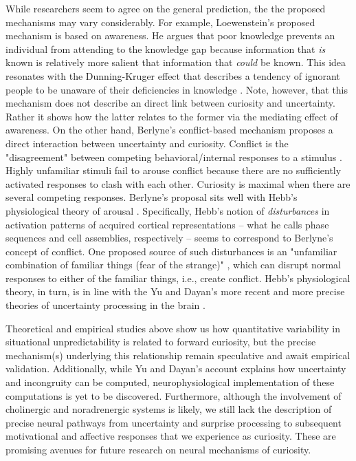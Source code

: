 While researchers seem to agree on the general prediction, the the proposed mechanisms may vary considerably. For example, Loewenstein's \cite{loewenstein_psychology_1994} proposed mechanism is based on awareness. He argues that poor knowledge prevents an individual from attending to the knowledge gap because information that \emph{is} known is relatively more salient that information that \emph{could} be known. This idea resonates with the Dunning-Kruger effect that describes a tendency of ignorant people to be unaware of their deficiencies in knowledge \cite{dunning_chapter_2011}. Note, however, that this mechanism does not describe an direct link between curiosity and uncertainty. Rather it shows how the latter relates to the former via the mediating effect of awareness. On the other hand, Berlyne's \cite{berlyne_theory_1954} conflict-based mechanism proposes a direct interaction between uncertainty and curiosity. Conflict is the "disagreement" between competing behavioral/internal responses to a stimulus \cite{berlyne_theory_1954,berlyne_uncertainty_1957}. Highly unfamiliar stimuli fail to arouse conflict because there are no sufficiently activated responses to clash with each other. Curiosity is maximal when there are several competing responses. Berlyne's proposal sits well with Hebb's physiological theory of arousal \cite{hebb_drives_1955}. Specifically, Hebb's notion of \emph{disturbances} in activation patterns of acquired cortical representations -- what he calls phase sequences and cell assemblies, respectively \cite{hebb_organization_2002} -- seems to correspond to Berlyne's concept of conflict. One proposed source of such disturbances is an "unfamiliar combination of familiar things (fear of the strange)" \cite[][, p. 250]{hebb_organization_2002}, which can disrupt normal responses to either of the familiar things, i.e., create conflict. Hebb's physiological theory, in turn, is in line with the Yu and Dayan's more recent and more precise theories of uncertainty processing in the brain \cite{yu_expected_2003,yu_uncertainty_2005}.

Theoretical and empirical studies above show us how quantitative variability in situational unpredictability is related to forward curiosity, but the precise mechanism(s) underlying this relationship remain speculative and await empirical validation. Additionally, while Yu and Dayan's account explains how uncertainty and incongruity can be computed, neurophysiological implementation of these computations is yet to be discovered. Furthermore, although the involvement of cholinergic and noradrenergic systems is likely, we still lack the description of precise neural pathways from uncertainty and surprise processing to subsequent motivational and affective responses that we experience as curiosity. These are promising avenues for future research on neural mechanisms of curiosity.


